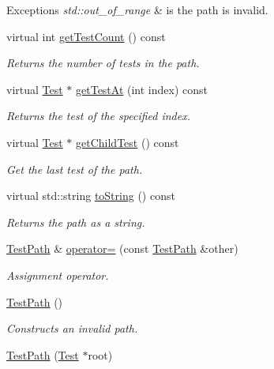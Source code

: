\begin{DoxyCompactItemize}
\begin{DoxyCompactList}
\begin{DoxyExceptions}{Exceptions}
{\em std\+::out\+\_\+of\+\_\+range} & is the path is invalid. \\
\hline
\end{DoxyExceptions}
\end{DoxyCompactList}\item 
virtual int \hyperlink{class_test_path_abddfb30585d9888b4914603071b0676e}{get\+Test\+Count} () const 
\begin{DoxyCompactList}\small\item\em Returns the number of tests in the path. \end{DoxyCompactList}\item 
virtual \hyperlink{class_test}{Test} $\ast$ \hyperlink{class_test_path_ab91b3a4bf8a5881f03f119d1af475e6e}{get\+Test\+At} (int index) const 
\begin{DoxyCompactList}\small\item\em Returns the test of the specified index. \end{DoxyCompactList}\item 
virtual \hyperlink{class_test}{Test} $\ast$ \hyperlink{class_test_path_a4f3c6d50ae76ea68dd42a1b59c8beb79}{get\+Child\+Test} () const 
\begin{DoxyCompactList}\small\item\em Get the last test of the path. \end{DoxyCompactList}\item 
virtual std\+::string \hyperlink{class_test_path_a81fd857b678a51a56db150b5c4d32971}{to\+String} () const 
\begin{DoxyCompactList}\small\item\em Returns the path as a string. \end{DoxyCompactList}\item 
\hyperlink{class_test_path}{Test\+Path} \& \hyperlink{class_test_path_a0734034ea15d0b4b8dd125d06ffc2cfd}{operator=} (const \hyperlink{class_test_path}{Test\+Path} \&other)
\begin{DoxyCompactList}\small\item\em Assignment operator. \end{DoxyCompactList}\item 
\hyperlink{class_test_path_ab1fd9894ea271a225b95384497bc420e}{Test\+Path} ()
\begin{DoxyCompactList}\small\item\em Constructs an invalid path. \end{DoxyCompactList}\item 
\hyperlink{class_test_path_a12d673c5e1e107cdc7746264d01234d8}{Test\+Path} (\hyperlink{class_test}{Test} $\ast$root)

\end{DoxyCompactItemize}
